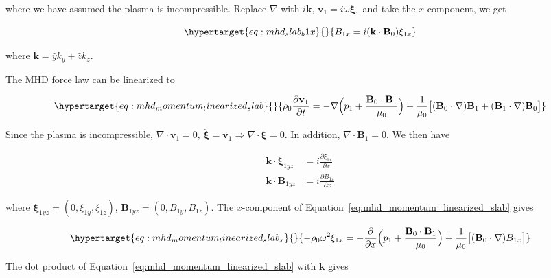 \documentclass[
  notoc %
]{tufte-book}
\begin{document}
where we have assumed the plasma is incompressible. Replace \(\nabla\)
with \(i\mathbf{k}\), \(\mathbf{v}_1=i\omega \pmb{\xi}_1\) and take the
\(x\)-component, we get

\begin{equation}\protect\hypertarget{eq:mhd_slab_b1x}{}{
B_{1x} = i(\mathbf{k}\cdot\mathbf{B}_0)\xi_{1x}
}\label{eq:mhd_slab_b1x}\end{equation}

where \(\mathbf{k}=\hat{y}k_y+\hat{z}k_z\).

The MHD force law can be linearized to

\begin{equation}\protect\hypertarget{eq:mhd_momentum_linearized_slab}{}{
\rho_0 \frac{\partial \mathbf{v}_1}{\partial t} = -\nabla\Big( p_1 + \frac{\mathbf{B}_0\cdot\mathbf{B}_1}{\mu_0}\Big) + \frac{1}{\mu_0}\big[ (\mathbf{B}_0\cdot\nabla)\mathbf{B}_1 + (\mathbf{B}_1\cdot\nabla)\mathbf{B}_0\big]
}\label{eq:mhd_momentum_linearized_slab}\end{equation}

Since the plasma is incompressible,
\(\nabla\cdot\pmb{v}_1=0,\ \dot{\pmb{\xi}}=\mathbf{v}_1\Rightarrow \nabla\cdot\pmb{\xi}=0\).
In addition, \(\nabla\cdot\mathbf{B}_1=0\). We then have

\[
\begin{aligned}
\mathbf{k}\cdot\pmb{\xi}_{1yz}&=i\frac{\partial \xi_{1x}}{\partial x} \\
\mathbf{k}\cdot\pmb{B}_{1yz}&=i\frac{\partial B_{1x}}{\partial x}
\end{aligned}
\]

where \(\pmb{\xi}_{1yz} = (0,\xi_{1y},\xi_{1z})\),
\(\mathbf{B}_{1yz}=(0,B_{1y},B_{1z})\). The \(x\)-component of
Equation~\ref{eq:mhd_momentum_linearized_slab} gives

\begin{equation}\protect\hypertarget{eq:mhd_momentum_linearized_slab_x}{}{
-\rho_0\omega^2 \xi_{1x} = -\frac{\partial}{\partial x}\Big( p_1 + \frac{\mathbf{B}_0\cdot\mathbf{B}_1}{\mu_0}\Big) +\frac{1}{\mu_0} \big[ (\mathbf{B}_0\cdot\nabla)B_{1x} \big]
}\label{eq:mhd_momentum_linearized_slab_x}\end{equation}

The dot product of Equation~\ref{eq:mhd_momentum_linearized_slab} with
\(\mathbf{k}\) gives
\end{document}
